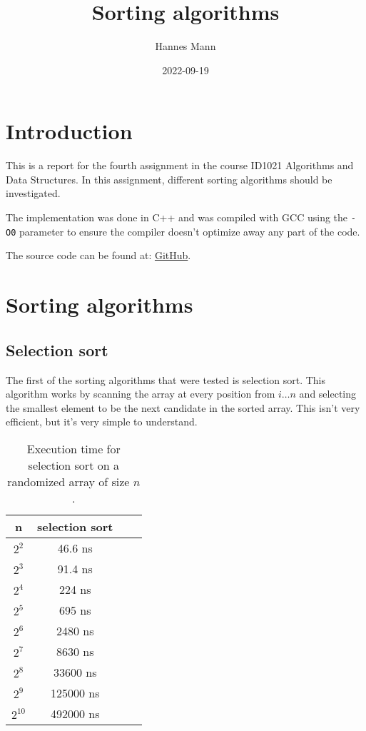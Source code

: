\documentclass[a4paper,11pt]{article}
\begin{document}
\title{
    \textbf{Sorting algorithms}
}
\author{Hannes Mann}
\date{2022-09-19}

\maketitle

\section*{Introduction}

This is a report for the fourth assignment in the course ID1021 Algorithms and Data Structures. In this assignment, different sorting algorithms should be investigated.

The implementation was done in C++ and was compiled with GCC using the {\tt -O0} parameter to ensure the compiler doesn't optimize away any part of the code.

The source code can be found at: \href{https://github.com/HannesMann/ID1021/tree/main/src/sort}{GitHub}.

\section*{Sorting algorithms}

\subsection*{Selection sort}

The first of the sorting algorithms that were tested is selection sort. This algorithm works by scanning the array at every position from $i \dots n$ and selecting the smallest element to be the next candidate in the sorted array.
This isn't very efficient, but it's very simple to understand.

\begin{table}[H]
\centering
\begin{tabular}{|c|c|c|c|}
\hline
\textbf{n} & \textbf{selection sort} \\
\hline
	$2^{2}$ & 46.6 ns \\
	$2^{3}$ & 91.4 ns \\
	$2^{4}$ & 224 ns \\
	$2^{5}$ & 695 ns \\
	$2^{6}$ & 2480 ns \\
	$2^{7}$ & 8630 ns \\
	$2^{8}$ & 33600 ns \\
	$2^{9}$ & 125000 ns \\
	$2^{10}$ & 492000 ns \\
\hline
\end{tabular}
\caption{Execution time for selection sort on a randomized array of size $n$.}
\label{tab:table1}
\end{table}
\end{document}

